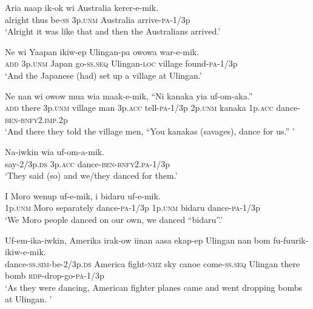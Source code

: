 {\ea\label{ex:a:x55}
\gll  Aria  naap  ik-ok  wi  Australia  kerer-e-mik. \\
alright  thus  be-\textsc{ss}  3p.\textsc{unm}  Australia  arrive-\textsc{pa}-1/3p \\
\glt ‘Alright it was like that and then the Australians arrived.’ \\
\z


\ea\label{ex:a:x56}
\gll  Ne  wi  Yaapan  ikiw-ep  Ulingan-pa  owowa war-e-mik. \\
\textsc{add}  3p.\textsc{unm}  Japan  go-\textsc{ss.seq}  Ulingan-\textsc{loc}  village found-\textsc{pa}-1/3p \\ 
\glt ‘And the Japanese (had) set up a village at Ulingan.’ \\
\z


\ea\label{ex:a:x57}
\gll  Ne  nan  wi  owow  mua  wia  maak-e-mik, “Ni  kanaka  yia  uf-om-aka.” \\
\textsc{add}  there  3p.\textsc{unm}  village  man  3p.\textsc{acc}  tell-\textsc{pa}-1/3p  2p.\textsc{unm}  kanaka  1p.\textsc{acc}  dance-\textsc{ben}-\textsc{bnfy}2.\textsc{imp}.2p \\ 
\glt ‘And there they told the village men, “You kanakas (savages), dance for us.” ’ \\
\z


\ea\label{ex:a:x58}
\gll  Na-iwkin  wia  uf-om-a-mik. \\
say-2/3p.\textsc{ds}  3p.\textsc{acc}  dance-\textsc{ben}-\textsc{bnfy}2.\textsc{pa}-1/3p \\
\glt ‘They said (so) and we/they danced for them.’ \\
\z


\ea\label{ex:a:x59}
\gll  I  Moro  wenup  uf-e-mik, i  bidaru  uf-e-mik. \\
1p.\textsc{unm}  Moro  separately  dance-\textsc{pa}-1/3p 1p.\textsc{unm}  bidaru  dance-\textsc{pa}-1/3p \\ 
\glt ‘We Moro people danced on our own, we danced “bidaru”.’ \\
\z


\ea\label{ex:a:x60}
\gll  Uf-em-ika-iwkin,  Amerika  irak-ow  iinan  aasa  ekap-ep  Ulingan  nan  bom  fu-fuurik-ikiw-e-mik. \\
dance-\textsc{ss}.\textsc{sim}-be-2/3p.\textsc{ds}  America  fight-\textsc{nmz}  sky  canoe come-\textsc{ss.seq}  Ulingan  there  bomb  \textsc{rdp}-drop-go-\textsc{pa}-1/3p \\ 
\glt ‘As they were dancing, American fighter planes came and went dropping bombs at Ulingan. ’ \\
\z


}
